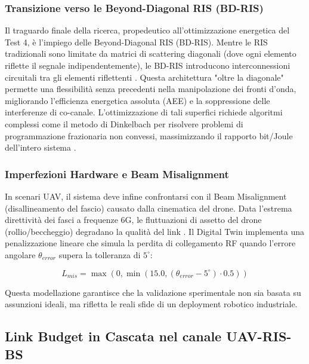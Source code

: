 \documentclass[twoside]{article}
\begin{document}
\subsubsection{Transizione verso le Beyond-Diagonal RIS (BD-RIS)}

Il traguardo finale della ricerca, propedeutico all'ottimizzazione energetica del Test 4, è l'impiego delle Beyond-Diagonal RIS (BD-RIS). Mentre le RIS tradizionali sono limitate da matrici di scattering diagonali (dove ogni elemento riflette il segnale indipendentemente), le BD-RIS introducono interconnessioni circuitali tra gli elementi riflettenti \cite{Khan2024,Wei2024}. Questa architettura "oltre la diagonale" permette una flessibilità senza precedenti nella manipolazione dei fronti d'onda, migliorando l'efficienza energetica assoluta (AEE) e la soppressione delle interferenze di co-canale. L'ottimizzazione di tali superfici richiede algoritmi complessi come il metodo di Dinkelbach per risolvere problemi di programmazione frazionaria non convessi, massimizzando il rapporto bit/Joule dell'intero sistema \cite{Khan2024}.

\subsubsection{Imperfezioni Hardware e Beam Misalignment}

In scenari UAV, il sistema deve infine confrontarsi con il Beam Misalignment (disallineamento del fascio) causato dalla cinematica del drone. Data l'estrema direttività dei fasci a frequenze 6G, le fluttuazioni di assetto del drone (rollio/beccheggio) degradano la qualità del link \cite{Muller2024}. Il Digital Twin implementa una penalizzazione lineare che simula la perdita di collegamento RF quando l'errore angolare $\theta_{error}$ supera la tolleranza di $5^\circ$: 

\begin{equation} 
L_{mis} = \max\left(0, \min\left(15.0, (\theta_{error} - 5^\circ) \cdot 0.5\right)\right) 
\label{eq:beam_misalignment} 
\end{equation}

Questa modellazione garantisce che la validazione sperimentale non sia basata su assunzioni ideali, ma rifletta le reali sfide di un deployment robotico industriale.
\subsection{Link Budget in Cascata nel canale UAV-RIS-BS}
\end{document}
